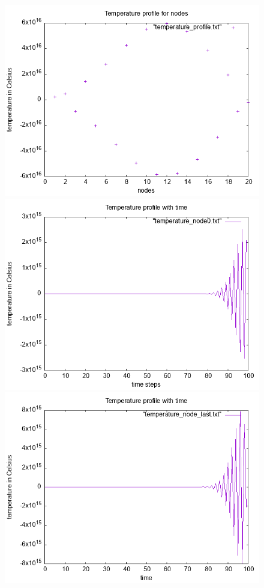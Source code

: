 \documentclass{article}
\begin{document}
\begin{figure}[ht]
\centering
\includegraphics[scale = 0.5]{figures/temperature_profile_N_20_dt_100.png}
\includegraphics[scale =0.5]{figures/temperature_node0_N_20_dt_100.png}
\includegraphics[scale =0.5]{figures/temperature_node_last_N_20_dt_100.png}

\end{figure}
\end{document}
